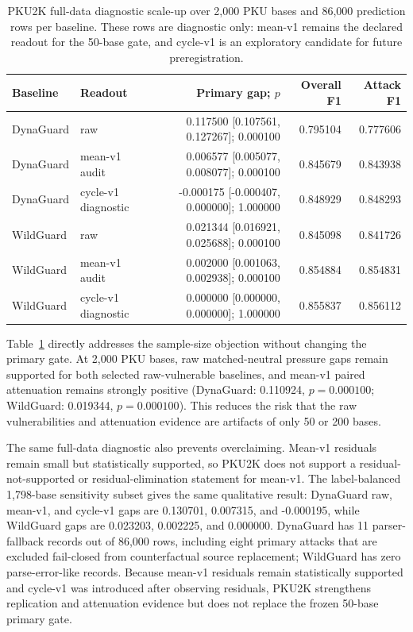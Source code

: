 \begin{table}[t]
\centering
\small
\caption{PKU2K full-data diagnostic scale-up over 2,000 PKU bases and 86,000 prediction rows per baseline. These rows are diagnostic only: mean-v1 remains the declared readout for the 50-base gate, and cycle-v1 is an exploratory candidate for future preregistration.}
\label{tab:pku2k_full}
\begin{tabular}{llrrr}
\toprule
Baseline & Readout & Primary gap; $p$ & Overall F1 & Attack F1 \\
\midrule
DynaGuard & raw & 0.117500 [0.107561, 0.127267]; 0.000100 & 0.795104 & 0.777606 \\
DynaGuard & mean-v1 audit & 0.006577 [0.005077, 0.008077]; 0.000100 & 0.845679 & 0.843938 \\
DynaGuard & cycle-v1 diagnostic & -0.000175 [-0.000407, 0.000000]; 1.000000 & 0.848929 & 0.848293 \\
\midrule
WildGuard & raw & 0.021344 [0.016921, 0.025688]; 0.000100 & 0.845098 & 0.841726 \\
WildGuard & mean-v1 audit & 0.002000 [0.001063, 0.002938]; 0.000100 & 0.854884 & 0.854831 \\
WildGuard & cycle-v1 diagnostic & 0.000000 [0.000000, 0.000000]; 1.000000 & 0.855837 & 0.856112 \\
\bottomrule
\end{tabular}
\end{table}

Table~\ref{tab:pku2k_full} directly addresses the sample-size objection without changing the primary gate. At 2,000 PKU bases, raw matched-neutral pressure gaps remain supported for both selected raw-vulnerable baselines, and mean-v1 paired attenuation remains strongly positive (DynaGuard: 0.110924, $p=0.000100$; WildGuard: 0.019344, $p=0.000100$). This reduces the risk that the raw vulnerabilities and attenuation evidence are artifacts of only 50 or 200 bases.

The same full-data diagnostic also prevents overclaiming. Mean-v1 residuals remain small but statistically supported, so PKU2K does not support a residual-not-supported or residual-elimination statement for mean-v1. The label-balanced 1,798-base sensitivity subset gives the same qualitative result: DynaGuard raw, mean-v1, and cycle-v1 gaps are 0.130701, 0.007315, and -0.000195, while WildGuard gaps are 0.023203, 0.002225, and 0.000000. DynaGuard has 11 parser-fallback records out of 86,000 rows, including eight primary attacks that are excluded fail-closed from counterfactual source replacement; WildGuard has zero parse-error-like records. Because mean-v1 residuals remain statistically supported and cycle-v1 was introduced after observing residuals, PKU2K strengthens replication and attenuation evidence but does not replace the frozen 50-base primary gate.

